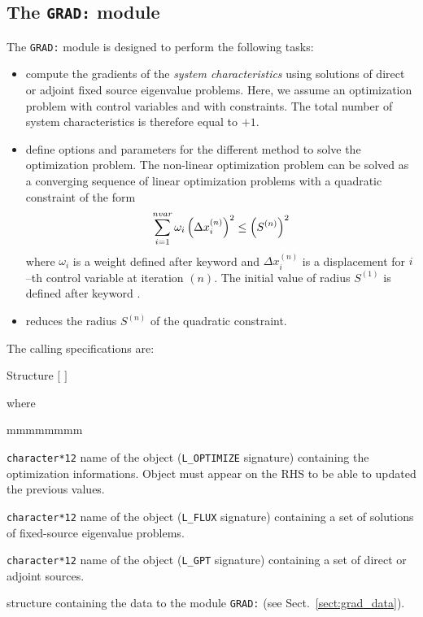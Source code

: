 \subsection{The \texttt{GRAD:} module}

The {\tt GRAD:} module is designed to perform the following tasks:
\begin{itemize}
\item compute the gradients of the {\sl system characteristics} using solutions of direct or adjoint
fixed source eigenvalue problems. Here, we assume an optimization problem with  control variables and
with  constraints. The total number of system characteristics is therefore equal to $+1$.

\item define options and parameters for the different method to solve the optimization problem. The non-linear
optimization problem can be solved as a converging sequence of linear optimization problems with a quadratic constraint
of the form
$$
\sum_{i=1}^{\sl nvar} \omega_i \left( \Delta x_i^{(n)}\right)^2 \le \left( S^{(n)}\right)^2
$$
\noindent where $\omega_i$ is a weight defined after keyword  and $\Delta x_i^{(n)}$ is a displacement for
$i$--th control variable at iteration $(n)$. The initial value of radius $S^{(1)}$ is defined after keyword .

\item reduces the radius $S^{(n)}$ of the quadratic constraint.
\end{itemize}

\vskip 0.08cm

The calling specifications are:

\begin{DataStructure}{Structure }
 \moc{:=}  $[$  $]$   \moc{::} 
\end{DataStructure}

\noindent where

\begin{ListeDeDescription}{mmmmmmmm}

\item[\dusa{OPTIM}] \texttt{character*12} name of the  object ({\tt L\_OPTIMIZE} signature) containing the
optimization informations. Object  must appear on the RHS to be able to updated the previous values.

\item[\dusa{DFLUX}] \texttt{character*12} name of the  object ({\tt L\_FLUX} signature) containing a set of
solutions of fixed-source eigenvalue problems.

\item[\dusa{GPT}] \texttt{character*12} name of the  object ({\tt L\_GPT} signature) containing a set of
direct or adjoint sources.

\item[\dstr{grad\_data}] structure containing the data to the module \texttt{GRAD:} (see Sect.~\ref{sect:grad_data}).

\end{ListeDeDescription}
\vskip 0.2cm


